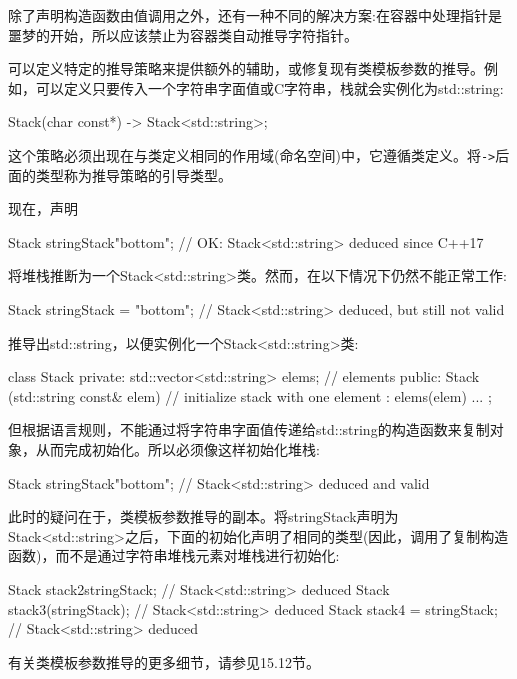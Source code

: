除了声明构造函数由值调用之外，还有一种不同的解决方案:在容器中处理指针是噩梦的开始，所以应该禁止为容器类自动推导字符指针。

可以定义特定的推导策略来提供额外的辅助，或修复现有类模板参数的推导。例如，可以定义只要传入一个字符串字面值或C字符串，栈就会实例化为std::string:

\begin{cpp}
Stack(char const*) -> Stack<std::string>;
\end{cpp}

这个策略必须出现在与类定义相同的作用域(命名空间)中，它遵循类定义。将\texttt{->}后面的类型称为推导策略的引导类型。

现在，声明

\begin{cpp}
Stack stringStack{"bottom"}; // OK: Stack<std::string> deduced since C++17
\end{cpp}

将堆栈推断为一个Stack<std::string>类。然而，在以下情况下仍然不能正常工作:

\begin{cpp}
Stack stringStack = "bottom"; // Stack<std::string> deduced, but still not valid
\end{cpp}

推导出std::string，以便实例化一个Stack<std::string>类:

\begin{cpp}
class Stack {
private:
	std::vector<std::string> elems; // elements
public:
	Stack (std::string const& elem) // initialize stack with one element
	: elems({elem}) {
	}
	...
};
\end{cpp}

但根据语言规则，不能通过将字符串字面值传递给std::string的构造函数来复制对象，从而完成初始化。所以必须像这样初始化堆栈:

\begin{cpp}
Stack stringStack{"bottom"}; // Stack<std::string> deduced and valid
\end{cpp}

此时的疑问在于，类模板参数推导的副本。将stringStack声明为Stack<std::string>之后，下面的初始化声明了相同的类型(因此，调用了复制构造函数)，而不是通过字符串堆栈元素对堆栈进行初始化:

\begin{cpp}
Stack stack2{stringStack}; // Stack<std::string> deduced
Stack stack3(stringStack); // Stack<std::string> deduced
Stack stack4 = {stringStack}; // Stack<std::string> deduced
\end{cpp}

有关类模板参数推导的更多细节，请参见15.12节。





















